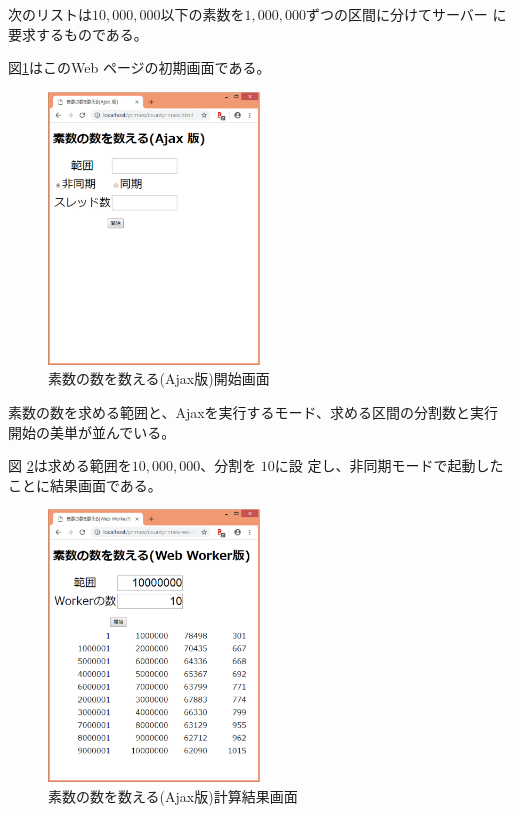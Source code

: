 \begin{Exec}\upshape\label{contPrimes}
 次のリストは$10,000,000$以下の素数を$1,000,000$ずつの区間に分けてサーバー
 に要求するものである。

 図\ref{countPrimes-Ajax-start}はこのWeb ページの初期画面である。
 \begin{figure}[ht]
	\begin{center}
	 \includegraphics[width=0.5\textwidth]{primes/countPrimes-start.eps}
	\end{center}
 \caption{素数の数を数える(Ajax版)開始画面}\label{countPrimes-Ajax-start}
 \end{figure}

 素数の数を求める範囲と、Ajaxを実行するモード、求める区間の分割数と実行
 開始の美単が並んでいる。

図 \ref{countPrimes-Ajax-res}は求める範囲を$10,000,000$、分割を $10$に設
 定し、非同期モードで起動したことに結果画面である。
 \begin{figure}[ht]
	\begin{center}
	 \includegraphics[width=0.5\textwidth]{primes/countPrimes-res.eps}
	\end{center}
 \caption{素数の数を数える(Ajax版)計算結果画面}\label{countPrimes-Ajax-res}
 \end{figure}


\end{Exec}
